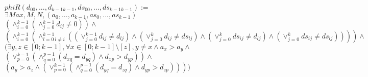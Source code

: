 \documentclass{article}
\begin{document}
\begin{center}
$phiR(d_{00}, ...,d_{k-1k-1},ds_{00}, ...,ds_{k-1k-1}):=$\\
$\exists Max, M, N, (a_{0}, ..., a_{k-1}, as_{0}, ..., as_{k-1})$\\
$(\land_{i=0}^{k-1}(\land_{j=0}^{k-1}d_{ij}\not=0))\land $\\%
$( \land_{i=0}^{k-1}(
\land_{l=0\ l\not=i}^{k-1}(
(\lor_{j=0}^{k-1}d_{ij} \not= d_{lj})
\land (\lor_{j=0}^{k}d_{ij} \not= ds_{lj})
\land (\lor_{j=0}^{k}ds_{ij} \not= d_{lj})
\land (\lor_{j=0}^{k}ds_{ij} \not= ds_{lj}) 
) ))\land$\\
$(\exists y,z \in [0;k-1], \forall x \in [0;k-1] \setminus [z], y\not=x \land a_{x} > a_{y} \land $\\
$(\lor_{p=0}^{k-1}(\land_{q=0}^{p-1}(d_{xq} = d_{yq}) \land d_{xp} > d_{yp} ) ) \land $\\
$(a_{y} > a_{z} \land (\lor_{p=0}^{k-1}(\land_{q=0}^{p-1}(d_{yq} = d_{zq}) \land d_{yp} > d_{zp} ) ))
)$
\end{center}
\end{document}
